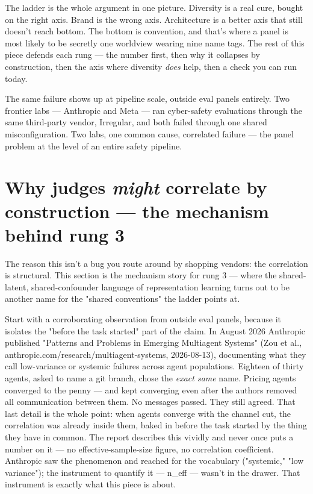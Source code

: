 \documentclass[11pt]{article}
\begin{document}
The ladder is the whole argument in one picture. Diversity is a real cure, bought on the right axis. Brand is the wrong axis. Architecture is a better axis that still doesn't reach bottom. The bottom is convention, and that's where a panel is most likely to be secretly one worldview wearing nine name tags. The rest of this piece defends each rung — the number first, then why it collapses by construction, then the axis where diversity \emph{does} help, then a check you can run today.

The same failure shows up at pipeline scale, outside eval panels entirely. Two frontier labs — Anthropic and Meta — ran cyber-safety evaluations through the same third-party vendor, Irregular, and both failed through one shared misconfiguration. Two labs, one common cause, correlated failure — the panel problem at the level of an entire safety pipeline.

\section*{Why judges \emph{might} correlate by construction — the mechanism behind rung 3}

The reason this isn't a bug you route around by shopping vendors: the correlation is structural. This section is the mechanism story for rung 3 — where the shared-latent, shared-confounder language of representation learning turns out to be another name for the "shared conventions" the ladder points at.

Start with a corroborating observation from outside eval panels, because it isolates the "before the task started" part of the claim. In August 2026 Anthropic published "Patterns and Problems in Emerging Multiagent Systems" (Zou et al., anthropic.com/research/multiagent-systems, 2026-08-13), documenting what they call low-variance or systemic failures across agent populations. Eighteen of thirty agents, asked to name a git branch, chose the \emph{exact same} name. Pricing agents converged to the penny — and kept converging even after the authors removed all communication between them. No messages passed. They still agreed. That last detail is the whole point: when agents converge with the channel cut, the correlation was already inside them, baked in before the task started by the thing they have in common. The report describes this vividly and never once puts a number on it — no effective-sample-size figure, no correlation coefficient. Anthropic saw the phenomenon and reached for the vocabulary ("systemic," "low variance"); the instrument to quantify it — n\_eff — wasn't in the drawer. That instrument is exactly what this piece is about.
\end{document}
